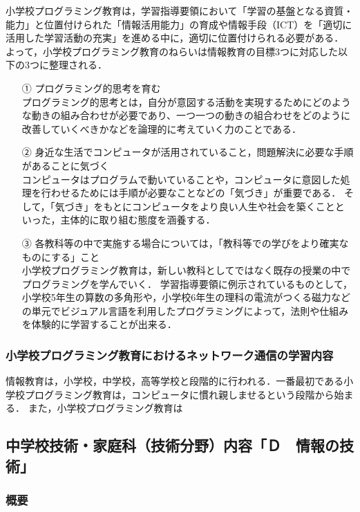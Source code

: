 \documentclass[12pt,a4j,titlepage]{ltjsarticle}
\begin{document}
小学校プログラミング教育は，学習指導要領において「学習の基盤となる資質・能力」と位置付けられた「情報活用能力」の育成や情報手段（ICT）を「適切に活用した学習活動の充実」を進める中に，適切に位置付けられる必要がある．
よって，小学校プログラミング教育のねらいは情報教育の目標3つに対応した以下の3つに整理される．
\begin{enumerate}

\item[①] プログラミング的思考を育む\mbox{}\\
プログラミング的思考とは，自分が意図する活動を実現するためにどのような動きの組み合わせが必要であり、一つ一つの動きの組合わせをどのように改善していくべきかなどを論理的に考えていく力のことである．

\item[➁] 身近な生活でコンピュータが活用されていること，問題解決に必要な手順があることに気づく\mbox{}\\
コンピュータはプログラムで動いていることや，コンピュータに意図した処理を行わせるためには手順が必要なことなどの「気づき」が重要である．
そして，「気づき」をもとにコンピュータをより良い人生や社会を築くことといった，主体的に取り組む態度を涵養する．

\item[③] 各教科等の中で実施する場合については，「教科等での学びをより確実なものにする」こと\mbox{}\\
小学校プログラミング教育は，新しい教科としてではなく既存の授業の中でプログラミングを学んでいく．
学習指導要領に例示されているものとして，小学校5年生の算数の多角形や，小学校6年生の理科の電流がつくる磁力などの単元でビジュアル言語を利用したプログラミングによって，法則や仕組みを体験的に学習することが出来る．

\end{enumerate}
\subsubsection{小学校プログラミング教育におけるネットワーク通信の学習内容}
情報教育は，小学校，中学校，高等学校と段階的に行われる．一番最初である小学校プログラミング教育は，コンピュータに慣れ親しませるという段階から始まる．
また，小学校プログラミング教育は


\subsection{中学校技術・家庭科（技術分野）内容「Ｄ　情報の技術」}
\subsubsection{概要}
\end{document}
